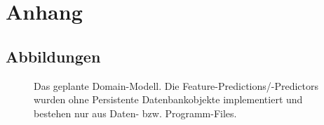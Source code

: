\documentclass[a4paper]{thesis}
\begin{document}
\newpage
\section{Anhang}
\renewcommand\stctitle{Inhalt}
\secttoc
\newpage
%
\subsection{Abbildungen}
%
\begin{figure}[h]\centering
{}
\caption[Domain Model]{
	Das geplante Domain-Modell.
	Die Feature-Predictions/-Predictors wurden ohne Persistente
	Datenbankobjekte implementiert und bestehen nur aus
	Daten- bzw. Programm-Files.
}
\label{fig:domainmodel}
\end{figure}
%
\end{document}
